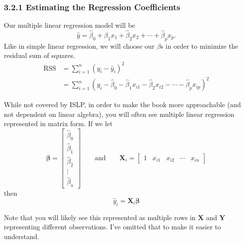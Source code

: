         \subsubsection*{3.2.1 Estimating the Regression Coefficients}\label{estimating-the-regression-coefficients}
        Our multiple linear regression model will be
        \begin{equation*}\tag{3.21}
            \hat y = \hat \beta_0 + \hat \beta_1 x_1 + \hat \beta_2 x_2 + \cdots + \hat \beta_p x_p.
        \end{equation*}
        Like in simple linear regression, we will choose our $\beta$s in order to minimize the residual sum of squares.
        \begin{align*}
            \text{RSS} &= \sum_{i=1}^n (y_i - \hat y_i)^2\\
                                &= \sum_{i=1}^n (y_i - \hat \beta_0 - \hat \beta_1 x_{i1} - \hat \beta_2 x_{i2} - \cdots - \hat \beta_p x_{ip})^2
        \end{align*}
        \begin{note}
            While not covered by ISLP, in order to make the book more approachable (and not dependent on linear algebra), you will often see multiple linear regression represented in matrix form.
            If we let
            \begin{equation*}
                \boldsymbol{\beta} = \begin{bmatrix*}
                    \hat \beta_0\\
                    \hat \beta_1 \\
                    \hat \beta_2 \\
                    \vdots \\
                    \hat \beta_n
                \end{bmatrix*} \qquad \text{and} \qquad 
                \mathbf{X}_i= \begin{bmatrix*}
                    1 & x_{i1} & x_{i2} & \cdots & x_{in}
                \end{bmatrix*}
            \end{equation*}
            then
            \begin{equation*}
                \hat y_i = \mathbf{X}_i\boldsymbol{\beta}
             \end{equation*}
             
             Note that you will likely see this represented as multiple rows in $\mathbf{X}$ and $\mathbf{Y}$ representing different observations.  I've omitted that to make it easier to understand.
        \end{note}
        

